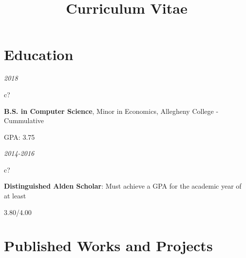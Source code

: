 \documentclass[12pt,a4paper,sans]{moderncv} %
\title{Curriculum Vitae}
\begin{document}
\begin{comment}
\hspace{2 mm}
\textit{2018}
\hspace{2 mm}
\begin{tabular}{c?}
 \\
\end{tabular}
 \hspace{2 mm}
 \textbf{B.S. in Computer Science}, Minor in Economics, Allegheny College - Cummulative GPA: 3.75
\end{comment}

\makecvtitle %
\vspace{-13 mm}
\section{Education}
\hspace{11 mm}
\textit{2018}
\hspace{2 mm}
\begin{tabular}{c?}
 \\
\end{tabular}
 \hspace{2 mm}
 \textbf{B.S. in Computer Science}, Minor in Economics, Allegheny College - Cummulative 
 
 \hspace{31.5 mm}GPA: 3.75
 
 \vspace{1 mm}
 \hspace{2 mm}
\textit{2014-2016}
\hspace{2 mm}
\begin{tabular}{c?}
 \\
\end{tabular}
 \hspace{2 mm}
 \textbf{Distinguished Alden Scholar}: Must achieve a GPA for the academic year of at least 
 
 \hspace{31.5 mm}3.80/4.00

\vspace{5 mm}
\section{Published Works and Projects}
\end{document}
